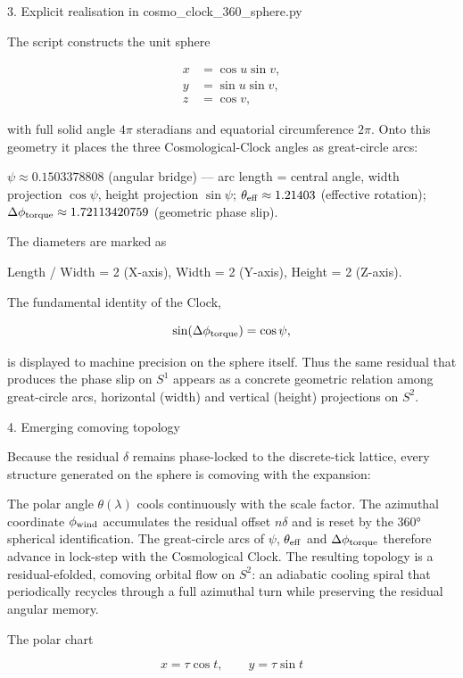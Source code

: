 3. Explicit realisation in cosmo_clock_360_sphere.py

The script constructs the unit sphere

\[
\begin{align*}
x&=\cos u\sin v,\\
y&=\sin u\sin v,\\
z&=\cos v,
\end{align*}
\]

with full solid angle \(4\pi\) steradians and equatorial circumference \(2\pi\). Onto this geometry it places the three Cosmological-Clock angles as great-circle arcs:

\(\psi\approx0.1503378808\) (angular bridge) — arc length = central angle, width projection \(\cos\psi\), height projection \(\sin\psi\);
\(\theta_{\rm eff}\approx1.21403\) (effective rotation);
\(\Delta\phi_{\rm torque}\approx1.72113420759\) (geometric phase slip).

The diameters are marked as

Length / Width = 2 (X-axis),
Width = 2 (Y-axis),
Height = 2 (Z-axis).

The fundamental identity of the Clock,

\[
\sin(\Delta\phi_{\rm torque})=\cos\psi,
\]

is displayed to machine precision on the sphere itself. Thus the same residual that produces the phase slip on \(S^1\) appears as a concrete geometric relation among great-circle arcs, horizontal (width) and vertical (height) projections on \(S^2\).

4. Emerging comoving topology

Because the residual \(\delta\) remains phase-locked to the discrete-tick lattice, every structure generated on the sphere is comoving with the expansion:

The polar angle \(\theta(\lambda)\) cools continuously with the scale factor.
The azimuthal coordinate \(\phi_{\rm wind}\) accumulates the residual offset \(n\delta\) and is reset by the 360° spherical identification.
The great-circle arcs of \(\psi\), \(\theta_{\rm eff}\) and \(\Delta\phi_{\rm torque}\) therefore advance in lock-step with the Cosmological Clock.
The resulting topology is a residual-efolded, comoving orbital flow on \(S^2\): an adiabatic cooling spiral that periodically recycles through a full azimuthal turn while preserving the residual angular memory.

The polar chart

\[
x=\tau\cos t,\qquad y=\tau\sin t
\]

